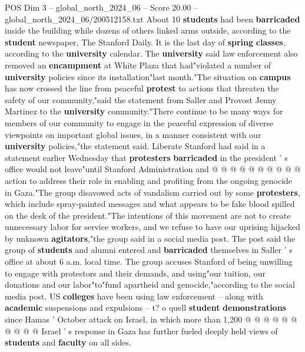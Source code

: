 \begin{textsample}{POS Dim 3 – global\_north\_2024\_06 – Score 20.00 – global\_north\_2024\_06/200512158.txt}
About 10 \textbf{students} had been \textbf{barricaded} inside the building while dozens of others linked arms outside, according to the \textbf{student} newspaper, The Stanford Daily.
It is the last day of \textbf{spring} \textbf{classes}, according to the \textbf{university} calendar.
The \textbf{university} said law enforcement also removed an \textbf{encampment} at White Plaza that had"violated a number of \textbf{university} policies since its installation"last month."The situation on \textbf{campus} has now crossed the line from peaceful \textbf{protest} to actions that threaten the safety of our community,"said the statement from Saller and Provost Jenny Martinez to the \textbf{university} community."There continue to be many ways for members of our community to engage in the peaceful expression of diverse viewpoints on important global issues, in a manner consistent with our \textbf{university} policies,"the statement said.
Liberate Stanford had said in a statement earlier Wednesday that \textbf{protesters} \textbf{barricaded} in the president ' s office would not leave"until Stanford Administration and @ @ @ @ @ @ @ @ @ @ action to address their role in enabling and profiting from the ongoing genocide in Gaza."The group disavowed acts of vandalism carried out by some \textbf{protesters}, which include spray-painted messages and what appears to be fake blood spilled on the desk of the president."The intentions of this movement are not to create unnecessary labor for service workers, and we refuse to have our uprising hijacked by unknown \textbf{agitators},"the group said in a social media post.
The post said the group of \textbf{students} and alumni entered and \textbf{barricaded} themselves in Saller ' s office at about 6 a.m. local time.
The group accuses Stanford of being unwilling to engage with protestors and their demands, and using"our tuition, our donations and our labor"to"fund apartheid and genocide,"according to the social media post.
US \textbf{colleges} have been using law enforcement -- along with \textbf{academic} suspensions and expulsions -- t? o quell \textbf{student} \textbf{demonstrations} since Hamas ' October attack on Israel, in which more than 1,200 @ @ @ @ @ @ @ @ @ @ Israel ' s response in Gaza has further fueled deeply held views of \textbf{students} and \textbf{faculty} on all sides.

\end{textsample}
